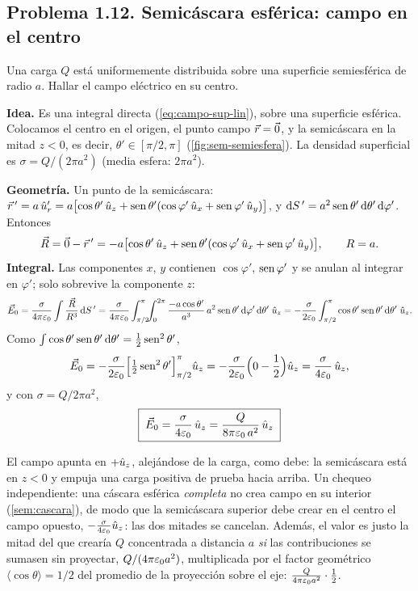 \subsection{Problema 1.12. Semicáscara esférica: campo en el centro}\label{sem:semiesfera}
\begin{ejercicio}\label{ejer:semiesfera}
Una carga $Q$ está uniformemente distribuida sobre una superficie semiesférica de radio $a$. Hallar el campo eléctrico en su centro.
\end{ejercicio}

\begin{resolucion}
\textbf{Idea.} Es una integral directa (\cref{eq:campo-sup-lin}), sobre una superficie esférica. Colocamos el centro en el origen, el punto campo $\vec{r}=\vec{0}$, y la semicáscara en la mitad $z<0$, es decir, $\theta'\in[\pi/2,\pi]$ (\cref{fig:sem-semiesfera}).
La densidad superficial es $\sigma=Q/(2\pi a^{2})$ (media esfera: $2\pi a^{2}$).

\textbf{Geometría.} Un punto de la semicáscara: $\vec{r}\,'=a\,\hat{u}_{r}'=a\bigl[\cos\theta'\,\hat{u}_{z}+\operatorname{sen}\theta'(\cos\varphi'\,\hat{u}_{x}+\operatorname{sen}\varphi'\,\hat{u}_{y})\bigr]$, y $\mathrm{d} S\,'=a^{2}\operatorname{sen}\theta'\,\mathrm{d}\theta'\,\mathrm{d}\varphi'$. Entonces
\[
  \vec{R}=\vec{0}-\vec{r}\,'=-a\bigl[\cos\theta'\,\hat{u}_{z}+\operatorname{sen}\theta'(\cos\varphi'\,\hat{u}_{x}+\operatorname{sen}\varphi'\,\hat{u}_{y})\bigr],\qquad R=a .
\]
\textbf{Integral.} Las componentes $x$, $y$ contienen $\cos\varphi'$, $\operatorname{sen}\varphi'$ y se anulan al integrar en $\varphi'$; solo sobrevive la componente $z$:
\[
  \vec{E}_0=\frac{\sigma}{4\pi\varepsilon_{0}}\int\frac{\vec{R}}{R^{3}}\,\mathrm{d} S\,'=\frac{\sigma}{4\pi\varepsilon_{0}}\int_{\pi/2}^{\pi}\!\!\int_{0}^{2\pi}\frac{-a\cos\theta'}{a^{3}}\,a^{2}\operatorname{sen}\theta'\,\mathrm{d}\varphi'\,\mathrm{d}\theta'\;\hat{u}_{z}
  =-\frac{\sigma}{2\varepsilon_{0}}\int_{\pi/2}^{\pi}\cos\theta'\operatorname{sen}\theta'\,\mathrm{d}\theta'\;\hat{u}_{z} .
\]
Como $\int\cos\theta'\operatorname{sen}\theta'\,\mathrm{d}\theta'=\tfrac12\operatorname{sen}^{2}\theta'$,
\[
  \vec{E}_0=-\frac{\sigma}{2\varepsilon_{0}}\Bigl[\tfrac12\operatorname{sen}^{2}\theta'\Bigr]_{\pi/2}^{\pi}\hat{u}_{z}=-\frac{\sigma}{2\varepsilon_{0}}\Bigl(0-\frac12\Bigr)\hat{u}_{z}=\frac{\sigma}{4\varepsilon_{0}}\,\hat{u}_{z},
\]
y con $\sigma=Q/2\pi a^{2}$,
\[
  \boxed{\;\vec{E}_0=\frac{\sigma}{4\varepsilon_{0}}\,\hat{u}_{z}=\frac{Q}{8\pi\varepsilon_{0}\,a^{2}}\,\hat{u}_{z}\;}
\]
\end{resolucion}

\begin{observacion}[Comprobaciones]
El campo apunta en $+\hat{u}_{z}$, alejándose de la carga, como debe: la semicáscara está en $z<0$ y empuja una carga positiva de prueba hacia arriba. Un chequeo independiente: una cáscara esférica \emph{completa} no crea campo en su interior (\cref{sem:cascara}), de modo que la semicáscara
superior debe crear en el centro el campo opuesto, $-\frac{\sigma}{4\varepsilon_{0}}\hat{u}_{z}$: las dos mitades se cancelan. Además, el valor es justo la mitad del que crearía $Q$ concentrada a distancia $a$ \emph{si} las contribuciones se sumasen sin proyectar, $Q/(4\pi\varepsilon_{0} a^{2})$, multiplicada por el
factor geométrico $\langle\cos\theta\rangle=1/2$ del promedio de la proyección sobre el eje: $\frac{Q}{4\pi\varepsilon_{0} a^{2}}\cdot\frac12$.
\end{observacion}

